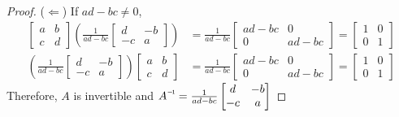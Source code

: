 \begin{proof}
	($\Leftarrow$) If $ad - bc \neq 0$,
	\begin{align*}
	\begin{bmatrix}
	a & b \\ c & d
	\end{bmatrix} (\frac{1}{ad-bc}\begin{bmatrix}
	d & -b \\ -c & a
	\end{bmatrix}) &= \frac{1}{ad-bc}\begin{bmatrix}
	ad-bc & 0 \\ 0 & ad-bc
	\end{bmatrix} = \begin{bmatrix}
	1 & 0 \\ 0 & 1
	\end{bmatrix} \\
	(\frac{1}{ad-bc}\begin{bmatrix}
	d & -b \\ -c & a
	\end{bmatrix}) \begin{bmatrix}
	a & b \\ c & d
	\end{bmatrix} &= \frac{1}{ad-bc}\begin{bmatrix}
	ad-bc & 0 \\ 0 & ad-bc
	\end{bmatrix} = \begin{bmatrix}
	1 & 0 \\ 0 & 1
	\end{bmatrix}
	\end{align*}
	Therefore, $A$ is invertible and $\inv{A} = \frac{1}{ad-bc}\begin{bmatrix}
	d & -b \\ -c & a
	\end{bmatrix}$
	

\end{proof}
